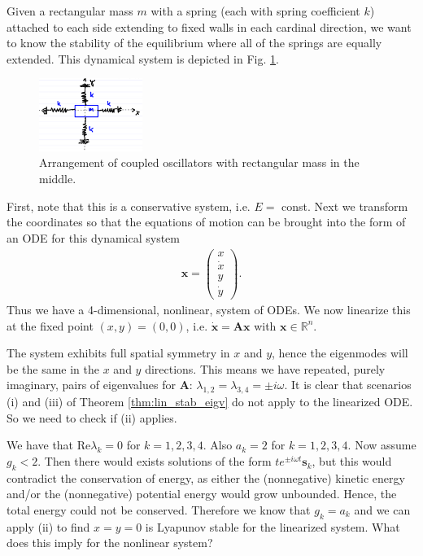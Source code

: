 \begin{ex}
	Given a rectangular mass $m$ with a spring (each with spring coefficient $k$) attached to each side extending to fixed walls in each cardinal direction, we want to know the stability of the equilibrium where all of the springs are equally extended. This dynamical system is depicted in Fig. \ref{fig:quad_spring}.
\begin{figure}[h!]
	\centering
	\includegraphics[width= 0.3\textwidth]{figures/ch2/11quad_spring.png}
\caption{Arrangement of coupled oscillators with rectangular mass in the middle.} \label{fig:quad_spring}
\end{figure}
First, note that this is a conservative system, i.e. $E=$ const. Next we transform the coordinates so that the equations of motion can be brought into the form of an ODE for this dynamical system
\begin{align}
	\bm{x} = 
	\begin{pmatrix}
		x \\ \dot{x} \\ y  \\ \dot{y}
	\end{pmatrix}.
\end{align}
Thus we have a 4-dimensional, nonlinear, system of ODEs. We now linearize this at the fixed point $(x,y)= (0,0)$, i.e. $\dot{\bm{x}} = \bm{A} \bm{x} $ with $\bm{x} \in \mathbb{R}^{n}$.

The system exhibits full spatial symmetry in $x$ and $y$, hence the eigenmodes will be the same in the $x$ and $y$ directions. This means we have repeated, purely imaginary, pairs of eigenvalues for $\bm{A} $:  $\lambda_{1,2}=\lambda_{3,4}= \pm i \omega $. It is clear that scenarios (i) and (iii) of Theorem \ref{thm:lin_stab_eigv} do not apply to the linearized ODE. So we need to check if (ii) applies.

We have that $ \textrm{Re} \lambda _{k}=0$ for $k=1,2,3,4$. Also $a_k=2$ for $k=1,2,3,4$. Now assume $g_k < 2$. Then there would exists solutions of the form $te^{\pm i \omega t}\bm{s}_k$, but this would contradict the conservation of energy, as either the (nonnegative) kinetic energy and/or the (nonnegative) potential energy would grow unbounded. Hence, the total energy could not be conserved. Therefore we know that $g_k = a_k$ and we can apply (ii) to find $x=y=0$ is Lyapunov stable for the linearized system. What does this imply for the nonlinear system?
\end{ex}

